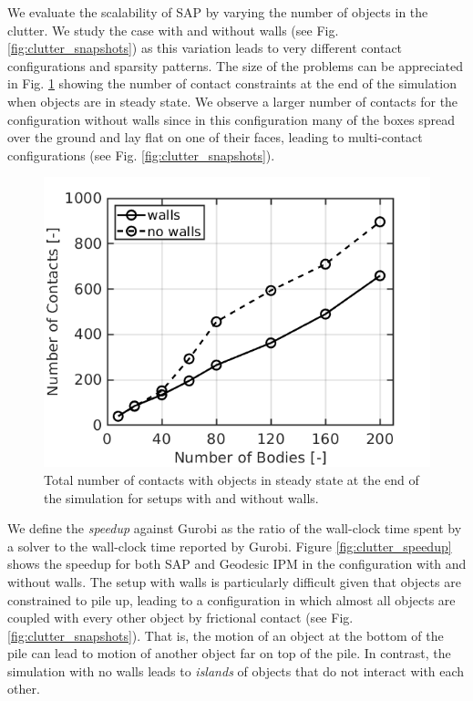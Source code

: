 We evaluate the scalability of SAP by varying the
number of objects in the clutter. We
study the case with and without walls (see
Fig. \ref{fig:clutter_snapshots}) as this variation leads to very
different contact configurations and sparsity patterns. The size of the problems can be
appreciated in Fig. \ref{fig:clutter_num_contats} showing the number of contact
constraints at the end of the simulation when objects are in steady state. We observe a larger number of contacts for the
configuration without walls since in this configuration many of the boxes spread
over the ground and lay flat on one of their faces, leading to multi-contact
configurations (see Fig. \ref{fig:clutter_snapshots}).
\begin{figure}[!h]
	\centering
	\includegraphics[width=0.7\columnwidth]{figures/clutter/number_of_contacts.png}
	\caption{\label{fig:clutter_num_contats} 
	Total number of contacts with objects in steady state at the end of the
	simulation for setups with and without walls.}
\end{figure}

We define the \emph{speedup} against Gurobi as the ratio of the wall-clock time spent by a solver to the wall-clock time reported by Gurobi. Figure \ref{fig:clutter_speedup} shows the speedup for both
SAP and Geodesic IPM in the configuration with and without walls.
The setup with walls is particularly difficult given that objects are
constrained to pile up, leading to a configuration in which almost all objects
are coupled with every other object by frictional contact
(see Fig. \ref{fig:clutter_snapshots}). That is, the motion of an object at the
bottom of the pile can lead to motion of another object far on top of the pile.
In contrast, the simulation with no walls leads to \emph{islands} of objects
that do not interact with each other.


